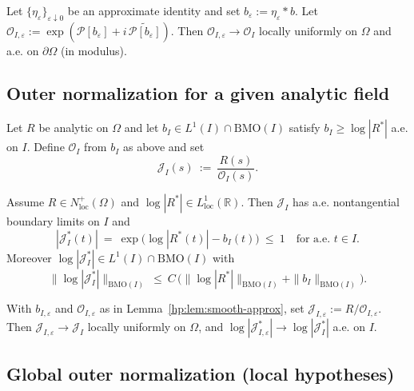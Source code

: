 \begin{lemma}\label{hp:lem:smooth-approx}
Let $\{\eta_\varepsilon\}_{\varepsilon\downarrow0}$ be an approximate identity and set $b_\varepsilon:=\eta_\varepsilon\ast b$.
Let $\mathcal O_{I,\varepsilon}:=\exp(\mathcal P[b_\varepsilon]+i\,\widetilde{\mathcal P[b_\varepsilon]})$.
Then $\mathcal O_{I,\varepsilon}\to \mathcal O_I$ locally uniformly on $\Omega$ and a.e. on $\partial\Omega$ (in modulus).
\end{lemma}

\subsection*{Outer normalization for a given analytic field}

\begin{definition}\label{hp:def:J}
Let $R$ be analytic on $\Omega$ and let $b_I\in L^1(I)\cap \mathrm{BMO}(I)$ satisfy $b_I\ge \log|R^*|$ a.e. on $I$.
Define $\mathcal O_I$ from $b_I$ as above and set
\[ \mathcal J_I(s)\ :=\ \frac{R(s)}{\mathcal O_I(s)}. \]
\end{definition}

\begin{theorem}\label{hp:thm:boundary-J}
Assume $R\in N^+_{\mathrm{loc}}(\Omega)$ and $\log|R^*|\in L^1_{\mathrm{loc}}(\mathbb{R})$.
Then $\mathcal J_I$ has a.e. nontangential boundary limits on $I$ and
\[ |\mathcal J_I^*(t)|\ =\ \exp\big(\log|R^*(t)|-b_I(t)\big)\ \le\ 1 \quad \text{for a.e. } t\in I. \]
Moreover $\log|\mathcal J_I^*|\in L^1(I)\cap \mathrm{BMO}(I)$ with
\[ \|\log|\mathcal J_I^*|\|_{\mathrm{BMO}(I)}\ \le\ C\,\big(\|\log|R^*|\|_{\mathrm{BMO}(I)}+\|b_I\|_{\mathrm{BMO}(I)}\big). \]
\end{theorem}

\begin{proposition}\label{hp:prop:stability}
With $b_{I,\varepsilon}$ and $\mathcal O_{I,\varepsilon}$ as in Lemma~\ref{hp:lem:smooth-approx}, set $\mathcal J_{I,\varepsilon}:=R/\mathcal O_{I,\varepsilon}$.
Then $\mathcal J_{I,\varepsilon}\to \mathcal J_I$ locally uniformly on $\Omega$, and $\log|\mathcal J_{I,\varepsilon}^*|\to\log|\mathcal J_I^*|$ a.e. on $I$.
\end{proposition}

\subsection*{Global outer normalization (local hypotheses)}

